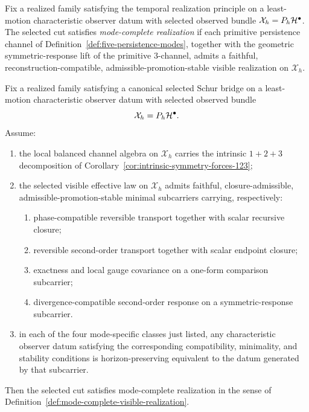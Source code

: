 \begin{definition}
\label{def:mode-complete-visible-realization}
Fix a realized family satisfying the temporal realization principle on a
least-motion characteristic observer datum with selected observed bundle
\(\mathcal X_h=P_h\mathcal{H}^\bullet\). The selected cut satisfies
\emph{mode-complete realization} if each primitive persistence
channel of Definition~\ref{def:five-persistence-modes}, together with the
geometric symmetric-response lift of the primitive \(3\)-channel, admits a
faithful, reconstruction-compatible, admissible-promotion-stable visible
realization on \(\mathcal X_h\).
\end{definition}

\begin{theorem}
\label{thm:inherited-compatibility-surface-forces-mode-complete-realization}
Fix a realized family satisfying a canonical selected Schur bridge on a
least-motion characteristic observer datum with selected observed bundle
\[
\mathcal X_h=P_h\mathcal{H}^\bullet.
\]
Assume:
\begin{enumerate}[label=(\roman*), leftmargin=2em, itemsep=0.2em]
\item the local balanced channel algebra on \(\mathcal X_h\) carries the
      intrinsic \(1+2+3\) decomposition of
      Corollary~\ref{cor:intrinsic-symmetry-forces-123};
\item the selected visible effective law on \(\mathcal X_h\) admits faithful,
      closure-admissible, admissible-promotion-stable minimal subcarriers
      carrying, respectively:
      \begin{enumerate}[label=(\alph*), leftmargin=2em, itemsep=0.1em]
      \item phase-compatible reversible transport together with scalar
            recursive closure;
      \item reversible second-order transport together with scalar endpoint
            closure;
      \item exactness and local gauge covariance on a one-form comparison
            subcarrier;
      \item divergence-compatible second-order response on a symmetric-response
            subcarrier.
      \end{enumerate}
\item in each of the four mode-specific classes just listed, any characteristic
      observer datum satisfying
      the corresponding compatibility, minimality, and stability conditions is
      horizon-preserving equivalent to the datum generated by that subcarrier.
\end{enumerate}
Then the selected cut satisfies mode-complete realization in
the sense of Definition~\ref{def:mode-complete-visible-realization}.
\end{theorem}

